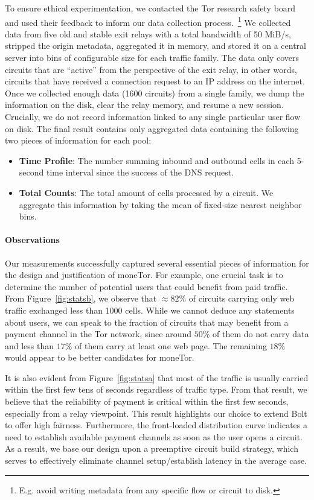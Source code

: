 To ensure ethical experimentation, we contacted the Tor research safety board~\cite{torsafety} and used their feedback to inform our data collection process.~\footnote{E.g.
avoid writing metadata from any specific flow or circuit to disk.}
We collected data from five old and stable exit relays with a total bandwidth of 50 MiB/s, stripped the origin metadata, aggregated it in memory, and stored it on a central server into bins of configurable size for each traffic family.
The data only covers circuits that are ``active'' from the perspective of the exit relay, in other words, circuits that have received a connection request to an IP address on the internet.
Once we collected enough data (1600 circuits) from a single family, we dump the information on the disk, clear the relay memory, and resume a new session.
Crucially, we do not record information linked to any single particular user flow on disk.
The final result contains only aggregated data containing the following two pieces of information for each pool:

\begin{itemize}
\item \textbf{Time Profile}: The number summing inbound and outbound cells in each 5-second time interval since the success of the DNS request.
\item \textbf{Total Counts}: The total amount of cells processed by a circuit.
  We aggregate this information by taking the mean of fixed-size nearest neighbor bins.
\end{itemize}

\paragraph*{Observations}

Our measurements successfully captured several essential pieces of information for the design and justification of moneTor.
For example, one crucial task is to determine the number of potential users that could benefit from paid traffic.
From Figure~\ref{fig:statsb}, we observe that $\approx 82\%$ of circuits carrying only web traffic exchanged less than 1000 cells.
While we cannot deduce any statements about users, we can speak to the fraction of circuits that may benefit from a payment channel in the Tor network, since around $50\%$ of them do not carry data and less than $17\%$ of them carry at least one web page.
The remaining $18\%$ would appear to be better candidates for moneTor.

It is also evident from Figure~\ref{fig:statsa} that most of the traffic is usually carried within the first few tens of seconds regardless of traffic type.
From that result, we believe that the reliability of payment is critical within the first few seconds, especially from a relay viewpoint.
This result highlights our choice to extend Bolt to offer high fairness.
Furthermore, the front-loaded distribution curve indicates a need to establish available payment channels as soon as the user opens a circuit.
As a result, we base our design upon a preemptive circuit build strategy, which serves to effectively eliminate channel setup/establish latency in the average case.
